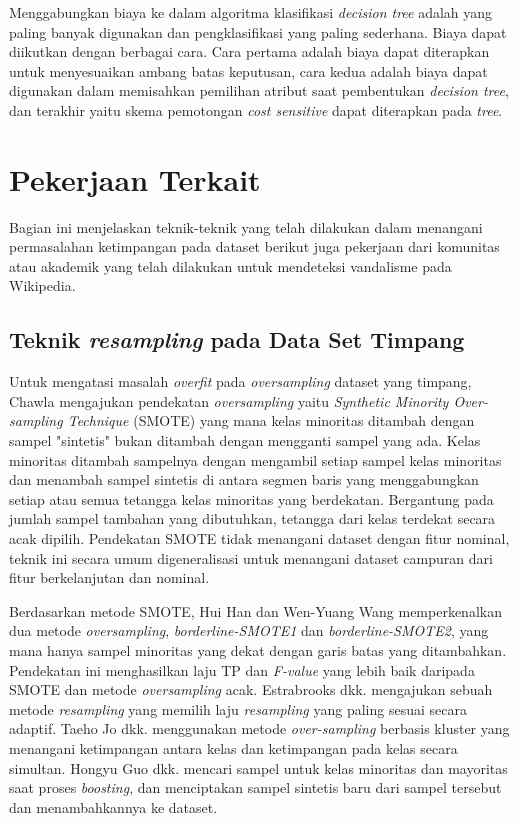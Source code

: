 \documentclass[12pt,a4paper,titlepage]{article}
\begin{document}
Menggabungkan biaya ke dalam algoritma klasifikasi \textit{decision tree} adalah yang paling banyak digunakan dan pengklasifikasi yang paling sederhana.
Biaya dapat diikutkan dengan berbagai cara.
Cara pertama adalah biaya dapat diterapkan untuk menyesuaikan ambang batas keputusan, cara kedua adalah biaya dapat digunakan dalam memisahkan pemilihan atribut saat pembentukan \textit{decision tree}, dan terakhir yaitu skema pemotongan \textit{cost sensitive} dapat diterapkan pada \textit{tree}.

\label{sec:pekerjaan-terkait}
\section{Pekerjaan Terkait}

Bagian ini menjelaskan teknik-teknik yang telah dilakukan dalam menangani permasalahan ketimpangan pada dataset berikut juga pekerjaan dari komunitas atau akademik yang telah dilakukan untuk mendeteksi vandalisme pada Wikipedia.

\label{subsec:teknik-resampling-dataset-timpang}
\subsection{Teknik \textit{resampling} pada Data Set Timpang}

Untuk mengatasi masalah \textit{overfit} pada \textit{oversampling} dataset yang timpang, Chawla \cite{chawla2002smote} mengajukan pendekatan \textit{oversampling} yaitu \textit{Synthetic Minority Over-sampling Technique} (SMOTE) yang mana kelas minoritas ditambah dengan sampel "sintetis" bukan ditambah dengan mengganti sampel yang ada.
Kelas minoritas ditambah sampelnya dengan mengambil setiap sampel kelas minoritas dan menambah sampel sintetis di antara segmen baris yang menggabungkan setiap atau semua tetangga kelas minoritas yang berdekatan.
Bergantung pada jumlah sampel tambahan yang dibutuhkan, tetangga dari kelas terdekat secara acak dipilih.
Pendekatan SMOTE tidak menangani dataset dengan fitur nominal, teknik ini secara umum digeneralisasi untuk menangani dataset campuran dari fitur berkelanjutan dan nominal.

Berdasarkan metode SMOTE, Hui Han dan Wen-Yuang Wang \cite{han2005borderline} memperkenalkan dua metode \textit{oversampling}, \textit{borderline-SMOTE1} dan \textit{borderline-SMOTE2}, yang mana hanya sampel minoritas yang dekat dengan garis batas yang ditambahkan.
Pendekatan ini menghasilkan laju TP dan \textit{F-value} yang lebih baik daripada SMOTE dan metode \textit{oversampling} acak.
Estrabrooks dkk. \cite{estabrooks2004multiple} mengajukan sebuah metode \textit{resampling} yang memilih laju \textit{resampling} yang paling sesuai secara adaptif.
Taeho Jo dkk. \cite{jo2004class} menggunakan metode \textit{over-sampling} berbasis kluster yang menangani ketimpangan antara kelas dan ketimpangan pada kelas secara simultan.
Hongyu Guo dkk. \cite{guo2004learning} mencari sampel untuk kelas minoritas dan mayoritas saat proses \textit{boosting}, dan menciptakan sampel sintetis baru dari sampel tersebut dan menambahkannya ke dataset.
\end{document}
